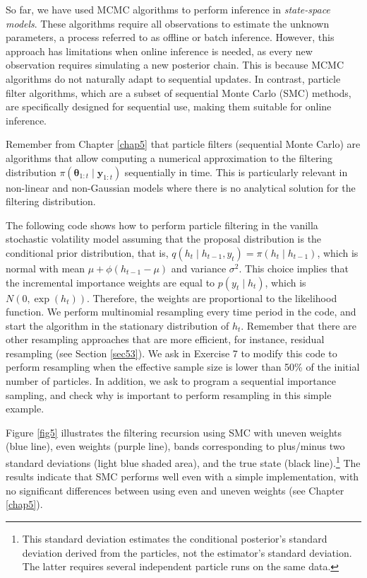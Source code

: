 So far, we have used MCMC algorithms to perform inference in \textit{state-space models}. These algorithms require all observations to estimate the unknown parameters, a process referred to as offline or batch inference. However, this approach has limitations when online inference is needed, as every new observation requires simulating a new posterior chain. This is because MCMC algorithms do not naturally adapt to sequential updates. In contrast, particle filter algorithms, which are a subset of sequential Monte Carlo (SMC) methods, are specifically designed for sequential use, making them suitable for online inference.    
     
Remember from Chapter \ref{chap5} that particle filters (sequential Monte Carlo) are algorithms that allow computing a numerical approximation to the filtering distribution $\pi(\bm{\theta}_{1:t}\mid \bm{y}_{1:t})$ sequentially in time. This is particularly relevant in non-linear and non-Gaussian models where there is no analytical solution for the filtering distribution.

The following code shows how to perform particle filtering in the vanilla stochastic volatility model assuming that the proposal distribution is the conditional prior distribution, that is, $q(h_t\mid h_{t-1},y_t)=\pi(h_t\mid h_{t-1})$, which is normal with mean $\mu+\phi(h_{t-1}-\mu)$ and variance $\sigma^2$. This choice implies that the incremental importance weights are equal to $p(y_t\mid h_t)$, which is $N(0,\exp(h_t))$. Therefore, the weights are proportional to the likelihood function. We perform multinomial resampling every time period in the code, and start the algorithm in the stationary distribution of $h_t$. Remember that there are other resampling approaches that are more efficient, for instance, residual resampling (see Section \ref{sec53}). We ask in Exercise 7 to modify this code to perform resampling when the effective sample size is lower than 50\% of the initial number of particles. In addition, we ask to program a sequential importance sampling, and check why is important to perform resampling in this simple example. 

Figure \ref{fig5} illustrates the filtering recursion using SMC with uneven weights (blue line), even weights (purple line), bands corresponding to plus/minus two standard deviations (light blue shaded area), and the true state (black line).\footnote{This standard deviation estimates the conditional posterior's standard deviation derived from the particles, not the estimator's standard deviation. The latter requires several independent particle runs on the same data.} The results indicate that SMC performs well even with a simple implementation, with no significant differences between using even and uneven weights (see Chapter \ref{chap5}).

